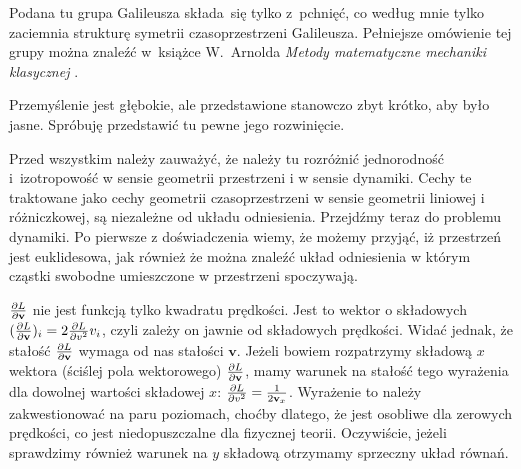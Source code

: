 \documentclass[a4paper,11pt]{article}
\numberwithin{equation}{section}
\begin{document}
\vspace{0em}


\noindent
{} Podana tu grupa Galileusza składa~się tylko z~pchnięć,
co według mnie tylko zaciemnia strukturę symetrii czasoprzestrzeni
Galileusza. Pełniejsze omówienie tej grupy można znaleźć w~książce
W.~Arnolda \textit{Metody matematyczne mechaniki klasycznej}
\cite{ArnoldMetodyMatematyczneMechanikiKlasycznej1981}.

\vspace{\spaceFour}





\noindent
{} Przemyślenie jest głębokie, ale przedstawione
stanowczo zbyt krótko, aby było jasne. Spróbuję przedstawić tu pewne
jego rozwinięcie.

Przed wszystkim należy zauważyć, że należy tu rozróżnić jednorodność
i~izotropowość w sensie geometrii przestrzeni i w sensie dynamiki.
Cechy te traktowane jako cechy geometrii czasoprzestrzeni w sensie
geometrii liniowej i różniczkowej, są niezależne od układu
odniesienia. Przejdźmy teraz do problemu dynamiki. Po pierwsze z
doświadczenia wiemy, że możemy przyjąć, iż przestrzeń jest
euklidesowa, jak również że można znaleźć układ odniesienia w którym
cząstki swobodne umieszczone w przestrzeni spoczywają.

\vspace{\spaceFour}





\noindent
{} $\frac{ \partial L }{ \partial \mathbf{v} }$ nie jest
funkcją tylko kwadratu prędkości. Jest to wektor o składowych
$( \frac{ \partial L }{ \partial \mathbf{v} } )_{ i }
= 2 \frac{ \partial L }{ \partial { v^{ 2 } } } v_{ i }$, czyli zależy on
jawnie od składowych prędkości. Widać jednak, że stałość
$\frac{ \partial L }{ \partial \mathbf{v} }$ wymaga od nas stałości
$\mathbf{ v }$. Jeżeli bowiem rozpatrzymy składową $x$ wektora
(ściślej pola wektorowego)
$\frac{ \partial L }{ \partial \mathbf{v} }$, mamy warunek na stałość
tego wyrażenia dla dowolnej wartości składowej $x$:
$\frac{ \partial L }{ \partial { v^{ 2 } } } = \frac{ 1 }{ 2 \mathbf{v}_{ x } }$.
Wyrażenie to należy zakwestionować na paru
poziomach, choćby dlatego, że jest osobliwe dla zerowych prędkości, co
jest niedopuszczalne dla fizycznej teorii. Oczywiście, jeżeli sprawdzimy
również warunek na $y$ składową otrzymamy sprzeczny układ równań.

\vspace{\spaceFour}
\end{document}

